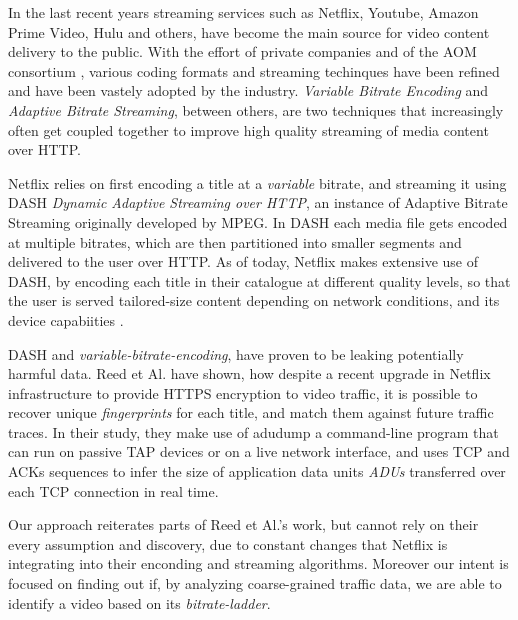 
In the last recent years streaming services such as Netflix, Youtube, Amazon
Prime Video, Hulu and others, have become the main source for video content
delivery to the public. With the effort of private companies and of the AOM
consortium \cite{aom}, various coding formats and streaming techinques have
been refined and have been vastely adopted by the industry.  \emph{Variable
Bitrate Encoding} and \emph{Adaptive Bitrate Streaming}, between others, are
two techniques that increasingly often get coupled together to improve high
quality streaming of media content over HTTP.

Netflix relies on first encoding a title at a \emph{variable} bitrate, and
streaming it using DASH \textit{Dynamic Adaptive Streaming over HTTP}, an
instance of Adaptive Bitrate Streaming originally developed by MPEG. In DASH
each media file gets encoded at multiple bitrates, which are then partitioned
into smaller segments and delivered to the user over HTTP. As of today, Netflix
makes extensive use of DASH, by encoding each title in their catalogue at
different quality levels, so that the user is served tailored-size content
depending on network conditions, and its device capabiities
\cite{per-title-encoding}.

DASH and \emph{variable-bitrate-encoding}, have proven to be leaking
potentially harmful data. Reed et Al. \cite{netflix-real-time} have shown, how
despite a recent upgrade in Netflix infrastructure to provide HTTPS encryption
to video traffic, it is possible to recover unique \emph{fingerprints} for each
title, and match them against future traffic traces. In their study, they make
use of adudump \cite{adudump} a command-line program that can run on passive
TAP devices \cite{tap} or on a live network interface, and uses TCP and ACKs
sequences to infer the size of application data units \emph{ADUs} transferred
over each TCP connection in real time.

Our approach reiterates parts of Reed et Al.'s work, but cannot rely on their
every assumption and discovery, due to constant changes that Netflix is
integrating into their enconding and streaming algorithms. Moreover our intent
is focused on finding out if, by analyzing coarse-grained traffic data, we are
able to identify a video based on its \emph{bitrate-ladder}.

